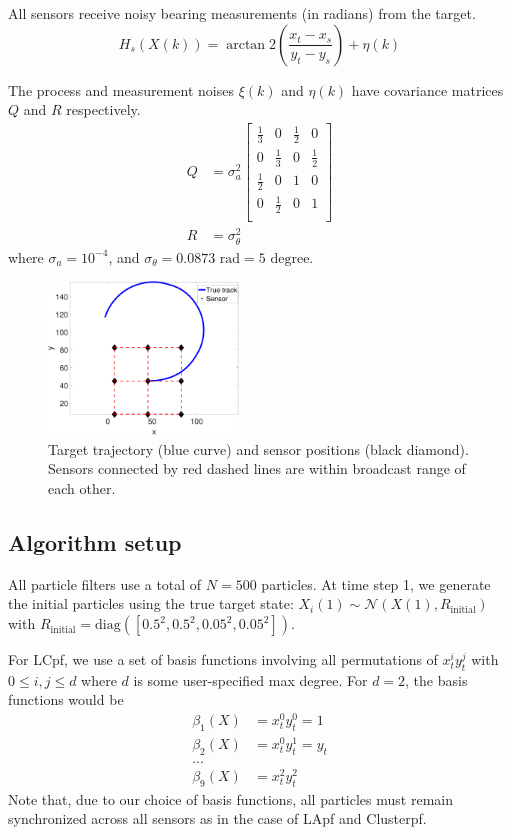 \documentclass[10pt,letterpaper,final]{article}
\begin{document}
All sensors receive noisy bearing measurements (in radians) from the target.
\begin{equation}
H_s(X(k))= \arctan2 \left( \frac{x_t-x_s}{y_t-y_s} \right) + \eta(k)
\end{equation}

The process and measurement noises $\xi(k)$ and $\eta(k)$ have covariance matrices $Q$ and $R$ respectively.
\begin{align}
Q &= \sigma_a^2
\left[
\begin{array}{cccc}
\frac{1}{3} & 0 & \frac{1}{2} & 0 \\
0 & \frac{1}{3} & 0 & \frac{1}{2} \\
\frac{1}{2} & 0 & 1 & 0 \\
0 & \frac{1}{2} & 0 & 1 \\
\end{array}
\right]\\
R &= \sigma_{\theta}^2
\end{align}
where $\sigma_a=10^{-4}$, and $\sigma_{\theta}=0.0873\text{ rad} = 5 \text{ degree}$.

\begin{figure}
\centering
\includegraphics[width=0.45\textwidth]{Figures/track}
\caption{Target trajectory (blue curve) and sensor positions (black diamond). Sensors connected by red dashed lines are within broadcast range of each other.}
\label{fig:track}
\end{figure}

\subsection{Algorithm setup}
All particle filters use a total of $N=500$ particles. At time step 1, we generate the initial particles using the true target state: $X_i(1) \sim \mathcal{N}(X(1), R_{\text{initial}})$ with $R_{\text{initial}}=\text{diag}([0.5^2,0.5^2,0.05^2,0.05^2])$. 

For LCpf, we use a set of basis functions involving all permutations of $x_t^iy_t^j$ with $0\leq i, j \leq d$ where $d$ is some user-specified max degree. For $d=2$, the basis functions would be
\begin{align*}
\beta_1(X) &= x_t^0 y_t^0 = 1 \\
\beta_2(X) &= x_t^0 y_t^1 = y_t \\
... \\
\beta_9(X) &= x_t^2 y_t^2 
\end{align*}
Note that, due to our choice of basis functions, all particles must remain synchronized across all sensors as in the case of LApf and Clusterpf. 
\end{document}
